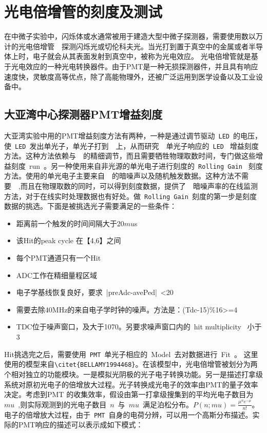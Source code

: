 
\chapter{光电倍增管的刻度及测试}
\label{chap:chap3}
在中微子实验中，闪烁体或水通常被用于建造大型中微子探测器，需要使用数以万计的光电倍增管~~探测闪烁光或切伦科夫光。当光打到置于真空中的金属或者半导体上时，电子就会从其表面发射到真空中，被称为光电效应。%
光电倍增管就是基于光电效应的一种光电转换器件。由于PMT是一种无损探测器件，并且具有响应速度快，灵敏度高等优点，除了高能物理外，还被广泛运用到医学设备以及工业设备中。


\section{大亚湾中心探测器PMT增益刻度}
大亚湾实验中用的PMT增益刻度方法有两种，一种是通过调节驱动~\texttt{LED}~的电压，使~\texttt{LED}~发出单光子，单光子打到~~上，从而研究~~单光子响应的~\texttt{LED}~ 增益刻度方法。这种方法依赖与~~的精细调节，而且需要牺牲物理取数时间，专门做这些增益刻度~run~。另一种使用来自非光源的单光电子进行刻度的~\texttt{Rolling Gain}~ 刻度方法。使用的单光电子主要来自~~的暗噪声以及随机触发数据。这种方法不需要~~,而且在物理取数的同时，可以得到刻度数据，提供了~~暗噪声率的在线监测方法，对于在线实时处理数据也有好处。做~\texttt{Rolling Gain}~刻度的第一步是刻度数据的挑选。下面是被挑选光子需要满足的一些条件：
\begin{itemize}
\item 距离前一个触发的时间间隔大于20$mu$s
\item 该Hit的peak cycle 在【4,6】之间
\item 每个PMT通道只有一个Hit
\item ADC工作在精细量程区域
\item 电子学基线恢复良好，要求~\left|preAdc-avePed\right|~<20
\item 需要去除40MHz的来自电子学时钟的噪声。方法是：(Tdc-15)\%16>=4
\item TDC位于噪声窗口，及大于1070。另要求噪声窗口内的~hit multiplicity~ 小于3
\end{itemize}
Hit挑选完之后，需要使用~\texttt{PMT}~单光子相应的~Model~去对数据进行~Fit~。 这里使用的模型来自\verb|\citet{BELLAMY1994468}|。在该模型中，光电倍增管被划分为两个相对独立的功能模块。一是模拟光阴极的光子电子转换功能。另一是描述打拿级系统对原初光电子的倍增放大过程。光子转换成光电子的效率由PMT的量子效率决定。考虑到PMT 的收集效率，假设由第一打拿级搜集到的平均光电子数目为~$mu$~,则实际观测到的光电子数目~$n$~与~$mu$~满足泊松分布。$P(n;mu)=\frac{\mu^{n}e^{-\mu}}{n!}$。 电子的倍增放大过程，由于~\texttt{PMT}~自身的电荷分辨，可以用一个高斯分布描述。实际的PMT响应的描述可以表示成如下模式：

